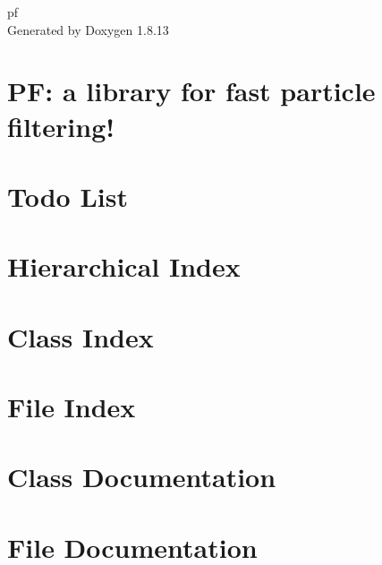\documentclass[twoside]{book}
\newcommand{\+}{\discretionary{\mbox{\scriptsize$\hookleftarrow$}}{}{}}
\newcommand{\clearemptydoublepage}{%
  \newpage{\pagestyle{empty}\cleardoublepage}%
}
\begin{document}
\hypersetup{pageanchor=false,
             bookmarksnumbered=true,
             pdfencoding=unicode
            }
\begin{titlepage}
\vspace*{7cm}
\begin{center}%
{\Large pf }\\
\vspace*{1cm}
{\large Generated by Doxygen 1.8.13}\\
\end{center}
\end{titlepage}
\clearemptydoublepage
{}
\tableofcontents
\clearemptydoublepage
{}
\hypersetup{pageanchor=true}

\chapter{PF\+: a library for fast particle filtering!}
\label{index}\hypertarget{index}{}
\chapter{Todo List}
\label{todo}

\chapter{Hierarchical Index}

\chapter{Class Index}

\chapter{File Index}

\chapter{Class Documentation}





















\chapter{File Documentation}










\backmatter
\newpage
{}
\clearemptydoublepage
{}
\printindex
\end{document}

